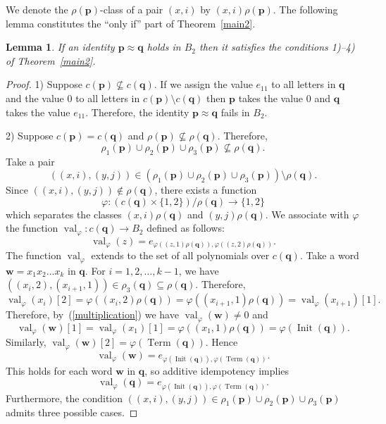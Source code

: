 \documentclass[12pt,draft]{amsart}
\newtheorem{lemma}{Lemma}
\DeclareMathOperator{\init}{Init}
\DeclareMathOperator{\term}{Term}
\DeclareMathOperator{\val}{val}
\begin{document}
We denote the $\rho(\mathbf p)$-class of a pair $(x,i)$ by $(x,i)\rho(\mathbf p)$. The following lemma constitutes the ``only if'' part of Theorem~\ref{main2}.

\begin{lemma}
\label{equivalence} If an identity $\mathbf p\approx\mathbf q$ holds in $B_2$ then it satisfies the conditions \textup{1)--4)} of Theorem~\textup{\ref{main2}}.
\end{lemma}
\begin{proof}
1) Suppose $c(\mathbf p)\not\subseteq c(\mathbf q)$. If we assign the value $e_{11}$ to all letters in $\mathbf q$ and the value $0$ to all letters in $c(\mathbf p)\setminus c(\mathbf q)$ then $\mathbf p$ takes the value $0$ and $\mathbf q$ takes the value $e_{11}$. Therefore, the identity $\mathbf p\approx\mathbf q$ fails in $B_2$.

2) Suppose $c(\mathbf p)=c(\mathbf q)$ and $\rho(\mathbf p)\not\subseteq\rho(\mathbf q)$. Therefore, 
$$\rho_1(\mathbf p)\cup\rho_2(\mathbf p)\cup\rho_3(\mathbf p)\not\subseteq\rho(\mathbf q).$$ 
Take a pair 
$$((x,i),(y,j))\in(\rho_1(\mathbf p)\cup\rho_2(\mathbf p)\cup\rho_3(\mathbf p))\setminus\rho(\mathbf q).$$ 
Since $((x,i),(y,j))\not\in\rho(\mathbf q)$, there exists a function 
\begin{equation}
\label{phi}
\varphi\colon(c(\mathbf q)\times\{1,2\})/\rho(\mathbf q)\rightarrow\{1,2\}
\end{equation}
which separates the classes $(x,i)\rho(\mathbf q)$ and $(y,j)\rho(\mathbf q)$. We associate with $\varphi$ the function $\val_{\varphi}\colon c(\mathbf q)\rightarrow B_2$ defined as follows: 
$$\val_{\varphi}(z)=e_{\varphi((z,1)\rho(\mathbf q)),\varphi((z,2)\rho(\mathbf q))}.$$
The function $\val_{\varphi}$ extends to the set of all polynomials over $c(\mathbf q)$. Take a word $\mathbf w=x_1x_2\dots x_k$ in $\mathbf q$. For $i=1,2,\dots,k-1$, we have $((x_i,2),(x_{i+1},1))\in\rho_3(\mathbf q)\subseteq\rho(\mathbf q)$. Therefore, 
$$\val_\varphi(x_i)[2]=\varphi((x_i,2)\rho(\mathbf q))=\varphi((x_{i+1},1)\rho(\mathbf q))=\val_\varphi(x_{i+1})[1].$$ 
Therefore, by~(\ref{multiplication}) we have $\val_{\varphi}(\mathbf w)\neq0$ and
$$\val_{\varphi}(\mathbf w)[1]=\val_{\varphi}(x_1)[1]=\varphi((x_1,1)\rho(\mathbf q))=\varphi(\init(\mathbf q)).$$
Similarly, $\val_{\varphi}(\mathbf w)[2]=\varphi(\term(\mathbf q))$. Hence 
$$\val_{\varphi}(\mathbf w)=e_{\varphi(\init(\mathbf q)),\varphi(\term(\mathbf q))}.$$
This holds for each word $\mathbf w$ in $\mathbf q$, so additive idempotency implies
$$\val_{\varphi}(\mathbf q)=e_{\varphi(\init(\mathbf q)),\varphi(\term(\mathbf q))}.$$ 
Furthermore, the condition $((x,i),(y,j))\in\rho_1(\mathbf p)\cup\rho_2(\mathbf p)\cup\rho_3(\mathbf p)$ admits three possible cases.


\end{proof}
\end{document}
